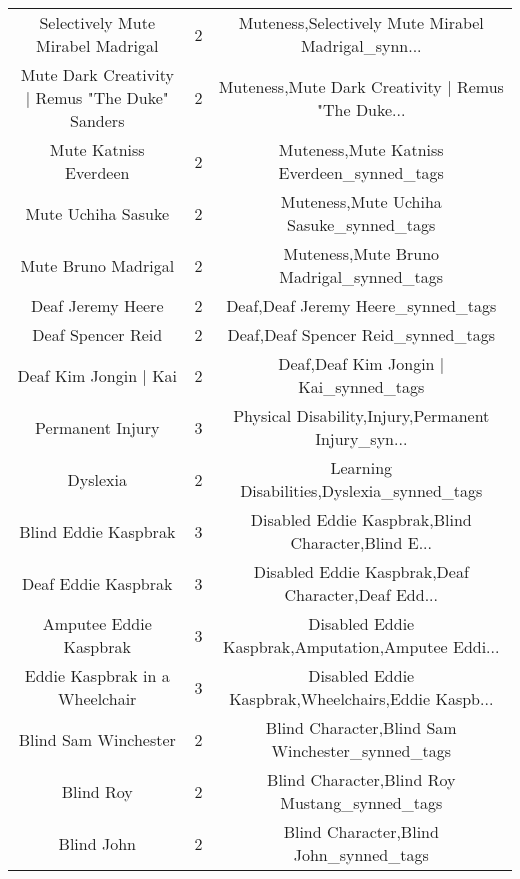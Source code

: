 \begin{table}[h!]
{\begin{tabular}{|c|c|c|}
                 Selectively Mute Mirabel Madrigal &          2 & Muteness,Selectively Mute Mirabel Madrigal\_synn... \\
   Mute Dark Creativity | Remus "The Duke" Sanders &          2 & Muteness,Mute Dark Creativity | Remus "The Duke... \\
                             Mute Katniss Everdeen &          2 &         Muteness,Mute Katniss Everdeen\_synned\_tags \\
                                Mute Uchiha Sasuke &          2 &            Muteness,Mute Uchiha Sasuke\_synned\_tags \\
                               Mute Bruno Madrigal &          2 &           Muteness,Mute Bruno Madrigal\_synned\_tags \\
                                 Deaf Jeremy Heere &          2 &                 Deaf,Deaf Jeremy Heere\_synned\_tags \\
                                 Deaf Spencer Reid &          2 &                 Deaf,Deaf Spencer Reid\_synned\_tags \\
                             Deaf Kim Jongin | Kai &          2 &             Deaf,Deaf Kim Jongin | Kai\_synned\_tags \\
                                  Permanent Injury &          3 & Physical Disability,Injury,Permanent Injury\_syn... \\
                                          Dyslexia &          2 &         Learning Disabilities,Dyslexia\_synned\_tags \\
                              Blind Eddie Kaspbrak &          3 & Disabled Eddie Kaspbrak,Blind Character,Blind E... \\
                               Deaf Eddie Kaspbrak &          3 & Disabled Eddie Kaspbrak,Deaf Character,Deaf Edd... \\
                            Amputee Eddie Kaspbrak &          3 & Disabled Eddie Kaspbrak,Amputation,Amputee Eddi... \\
                    Eddie Kaspbrak in a Wheelchair &          3 & Disabled Eddie Kaspbrak,Wheelchairs,Eddie Kaspb... \\
                              Blind Sam Winchester &          2 &   Blind Character,Blind Sam Winchester\_synned\_tags \\
                                         Blind Roy &          2 &      Blind Character,Blind Roy Mustang\_synned\_tags \\
                                        Blind John &          2 &             Blind Character,Blind John\_synned\_tags \\

\end{tabular}}
\end{table}
